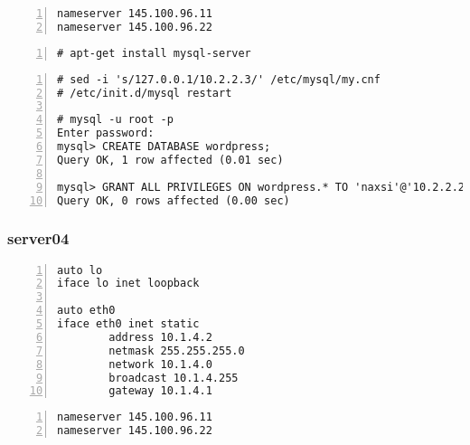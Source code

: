 \documentclass[Configuration]{subfiles}
\begin{document}
\begin{lstlisting}[frame=single,caption=/etc/resolv.conf,backgroundcolor=\color{gray},breaklines=true,numbers=left,]
nameserver 145.100.96.11
nameserver 145.100.96.22
\end{lstlisting}

\begin{lstlisting}[frame=single,caption=MySQL Server 5.1,backgroundcolor=\color{gray},breaklines=true,numbers=left,]
# apt-get install mysql-server
\end{lstlisting}

\begin{lstlisting}[frame=single,caption=MySQL configuration,backgroundcolor=\color{gray},breaklines=true,numbers=left,]
# sed -i 's/127.0.0.1/10.2.2.3/' /etc/mysql/my.cnf
# /etc/init.d/mysql restart

# mysql -u root -p
Enter password: 
mysql> CREATE DATABASE wordpress;
Query OK, 1 row affected (0.01 sec)

mysql> GRANT ALL PRIVILEGES ON wordpress.* TO 'naxsi'@'10.2.2.2' IDENTIFIED BY 'naxsi';
Query OK, 0 rows affected (0.00 sec)
\end{lstlisting}

\subsubsection{server04}

\begin{lstlisting}[frame=single,caption=/etc/network/interfaces,backgroundcolor=\color{gray},breaklines=true,numbers=left,]
auto lo
iface lo inet loopback

auto eth0
iface eth0 inet static
        address 10.1.4.2
        netmask 255.255.255.0
        network 10.1.4.0
        broadcast 10.1.4.255
        gateway 10.1.4.1
\end{lstlisting}

\begin{lstlisting}[frame=single,caption=/etc/resolv.conf,backgroundcolor=\color{gray},breaklines=true,numbers=left,]
nameserver 145.100.96.11
nameserver 145.100.96.22
\end{lstlisting}
\end{document}
